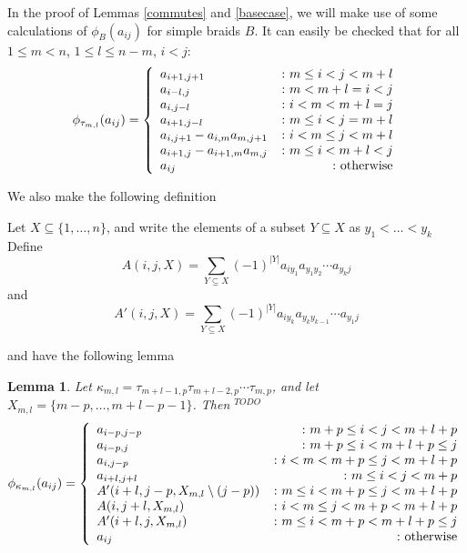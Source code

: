\documentclass[11pt]{amsart}
\def\todoit{{\color{red} $^{TODO}$}} %
\def\t{{\tau}}
\newtheorem{lem}[thm]{Lemma}
\begin{document}
In the proof of Lemmas \ref{commutes} and \ref{basecase}, we will make use of some calculations of $\phi_B(a_{ij})$ for simple braids $B$.  It can easily be checked that for all $1\le m < n$, $1\le l \le n - m$, $i<j$:
\begin{equation}\label{tau}
\phi_{\tau_{m,l}}(a_{ij}) =
\left\{
     \begin{array}{lr}
       a_{i+1,j+1} & \colon m\le i<j< m+l\\
       a_{i-l,j} & \colon m<m+l=i<j\\
       a_{i,j-l} & \colon i<m<m+l=j\\
       a_{i+1,j-l} & \colon m\le i < j = m+l\\
       a_{i,j+1}-a_{i,m}a_{m,j+1} & \colon i<m\le j< m+l\\
       a_{i+1,j}-a_{i+1,m}a_{m,j} & \colon m\le i< m+l<j\\
       a_{ij} & \colon \textnormal{otherwise}
     \end{array}
\right.
\end{equation}

\noindent We also make the following definition

\noindent Let $X\subseteq \{1,\ldots,n\}$, and write the elements of a subset $Y\subseteq X$ as $y_1<\ldots <y_k$  Define
$$
 A(i,j,X) = \sum_{Y\subseteq X}(-1)^{|Y|}a_{iy_1}a_{y_1y_2}\cdots a_{y_kj}
$$
and
$$
 A'(i,j,X) = \sum_{Y\subseteq X}(-1)^{|Y|}a_{iy_k}a_{y_ky_{k-1}}\cdots a_{y_1j}
$$



\noindent and have the following lemma

\begin{lem}\label{Sigma_n}
Let $\kappa_{m,l} = \t_{m+l-1,p}\t_{m+l-2,p}\cdots\t_{m,p}$, and let $X_{m,l} = \{m-p,\ldots,m+l-p-1\}$.  Then
\todoit
$$
\phi_{\kappa_{m,l}}(a_{ij}) =
\left\{
     \begin{array}{lr}
       a_{i-p,j-p} & \colon m+p\le i<j< m+l+p\\
       a_{i-p,j} &\colon m+p\le i< m+l+p\le j\\
       a_{i,j-p} & \colon i<m<m+p\le j<m+l+p\\
       a_{i+l,j+l} &\colon m\le i<j<m+p\\
       A'(i+l,j-p,X_{m,l}\setminus (j-p)) & \colon m\le i<m+p\le j <m+l+p\\
       A(i,j+l,X_{m,l}) & \colon i<m\le j <m+p<m+l+p\\
       A'(i+l,j,X_{m,l}) & \colon m\le i <m+p<m+l+p\le j\\
       a_{ij} & \colon \textnormal{otherwise}
     \end{array}
\right.
$$
\end{lem}
\end{document}
